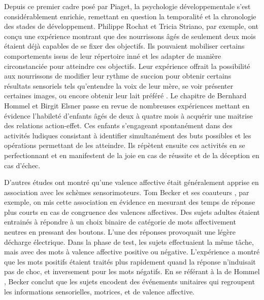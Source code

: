 Depuis ce premier cadre posé par Piaget, la psychologie développementale s'est considérablement enrichie, remettant en question la temporalité et la chronologie des stades de développement. 
Philippe Rochat et Tricia Striano, par exemple, ont conçu une expérience montrant que des nourrissons âgés de seulement deux mois étaient déjà capables de se fixer des objectifs.
Ils pouvaient mobiliser certains comportements issus de leur répertoire inné et les adapter de manière circonstanciée pour atteindre ces objectifs.
Leur expérience offrait la possibilité aux nourrissons de modifier leur rythme de succion pour obtenir certains résultats sensoriels tels qu'entendre la voix de leur mère, se voir présenter certaines images, ou encore obtenir leur lait préféré \cite{rochat_emerging_1999}. %
Le chapitre  de Bernhard Hommel et Birgit Elsner  \cite{hommel_acquisition_2009} passe en revue de nombreuses expériences mettant en évidence l'habileté d'enfants âgés de deux à quatre mois à acquérir une maitrise des relations action-effet.
Ces enfants s'engageant spontanément dans des activités ludiques consistant à identifier simultanément des buts possibles et les opérations permettant de les atteindre.
Ils répètent ensuite ces activités en se perfectionnant et en manifestent de la joie en cas de réussite et de la déception en cas d'échec.  

D'autres études ont montré qu'une valence affective était généralement apprise en association avec les schèmes sensorimoteurs. 
Tom Becker et ses coauteurs \cite{beckers_automatic_2002}, par exemple, on mis cette association en évidence en mesurant des temps de réponse plus courts en cas de congruence des valences affectives. 
Des sujets adultes étaient entrainés à  répondre à un choix binaire de catégorie de mots affectivement neutres en pressant des boutons. 
L'une des réponses provoquait une légère décharge électrique.
Dans la phase de test, les sujets effectuaient la même tâche, mais avec des mots à valence affective positive ou négative. 
L'expérience a montré que les mots positifs étaient traités plus rapidement quand la réponse n'induisait pas de choc, et inversement pour les mots négatifs. 
En se référant à la  de Hommel \cite{hommel_theory_2001}, Becker conclut que les sujets encodent des événements unitaires qui regroupent les informations sensorielles, motrices, et de valence affective. 

